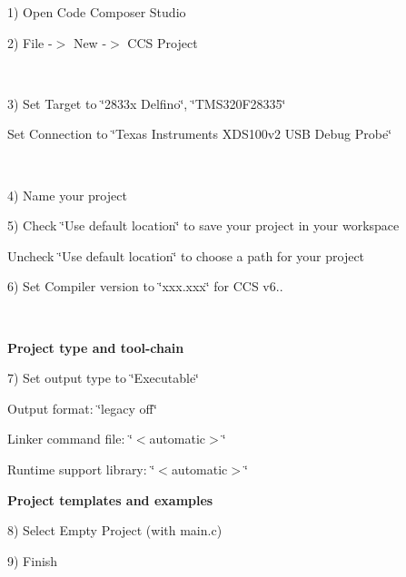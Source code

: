 1) Open Code Composer Studio

2) File -\/$>$ New -\/$>$ C\+CS Project

 ~\newline




3) Set Target to \char`\"{}2833x Delfino\char`\"{}, \char`\"{}\+T\+M\+S320\+F28335\char`\"{}

Set Connection to \char`\"{}\+Texas Instruments X\+D\+S100v2 U\+S\+B Debug Probe\char`\"{}

 ~\newline




4) Name your project

5) Check \char`\"{}\+Use default location\char`\"{} to save your project in your workspace ~\newline


Uncheck \char`\"{}\+Use default location\char`\"{} to choose a path for your project

6) Set Compiler version to \char`\"{}xxx.\+xxx\char`\"{} for C\+CS v6..

 ~\newline




{\bfseries{Project type and tool-\/chain}}

7) Set output type to \char`\"{}\+Executable\char`\"{}

Output format\+: \char`\"{}legacy off\char`\"{}

Linker command file\+: \char`\"{}$<$automatic$>$\char`\"{}

Runtime support library\+: \char`\"{}$<$automatic$>$\char`\"{}





{\bfseries{Project templates and examples}}

8) Select Empty Project (with main.\+c)

9) Finish

 